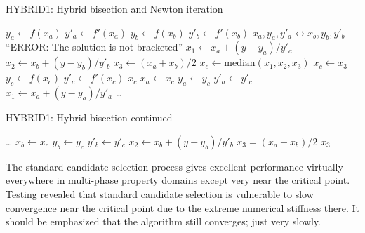 \begin{algorithm}
\caption{HYBRID1: Hybrid bisection and Newton iteration}\label{alg:hybrid1}
\begin{algorithmic}
\State $y_a \gets f(x_a)$   
\State $y'_a \gets f'(x_a)$
\State $y_b \gets f(x_b)$
\State $y'_b \gets f'(x_b)$
    \State $x_a,y_a,y'_a \leftrightarrow x_b,y_b,y'_b$  
\EndIf
{}
    \State \Return ``ERROR: The solution is not bracketed''
\EndIf
\State $x_1 \gets x_a + (y-y_a)/y'_a$   
\State $x_2 \gets x_b + (y-y_b)/y'_b$
\State $x_3 \gets (x_a + x_b)/2$
     
    \State $x_c \gets \mathrm{median}(x_1,x_2,x_3)$ 
     
        \State $x_c \gets x_3$ 
    \EndIf
    \State $y_c \gets f(x_c)$ 
    \State $y'_c\gets f'(x_c)$ 
     
        \State \Return $x_c$
    \EndIf
     
        \State $x_a \gets x_c$ 
        \State $y_a \gets y_c$
        \State $y'_a \gets y'_c$
        \State $x_1 \gets x_a + (y - y_a)/y'_a$ 
        \State \ldots
{}
\end{algorithmic}
\end{algorithm}

\begin{algorithm}
\caption{HYBRID1: Hybrid bisection continued}
\begin{algorithmic}
        \State \ldots
    \Else {}
        \State $x_b \gets x_c$ 
        \State $y_b \gets y_c$
        \State $y'_b \gets y'_c$
        \State $x_2 \gets x_b + (y - y_b)/y'_b$ 
    \EndIf
    \State $x_3 = (x_a + x_b)/2$    
\EndWhile
\State \Return $x_3$    
\EndProcedure
\end{algorithmic}
\end{algorithm}

The standard candidate selection process gives excellent performance virtually everywhere in multi-phase property domains except very near the critical point.  Testing revealed that standard candidate selection is vulnerable to slow convergence near the critical point due to the extreme numerical stiffness there.  It should be emphasized that the algorithm still converges; just very slowly.

